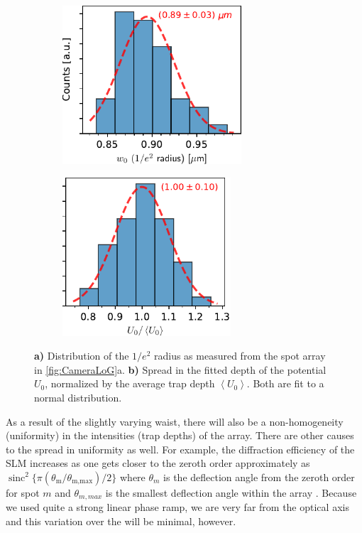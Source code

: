 \begin{figure}
	\begin{subfigure}{.49\linewidth}
		\centering
		\includegraphics[height=5.9cm]{figures/WaistHistogram.pdf}
		\caption{}
		\label{fig:WaistHistogram}
	\end{subfigure}
	\hfill
	\begin{subfigure}{.49\linewidth}
		\centering
		\includegraphics[height=5.9cm]{figures/DepthHistogram.pdf}
		\caption{}
		\label{fig:DepthHistogram}
	\end{subfigure}
	\caption{
	\textsf{\textbf{a)}} Distribution of the $1/e^2$ radius as measured from the spot array in \cref{fig:CameraLoG}a.
   \textsf{\textbf{b)}} Spread in the fitted depth of the potential $U_0$, normalized by the     average trap depth $\left\langle U_0 \right\rangle$.
    Both are fit to a normal distribution.
    }
\end{figure}


As a result of the slightly varying waist, there will also be a non-homogeneity (uniformity) in the intensities (trap depths) of the array.
There are other causes to the spread in uniformity as well.
For example, the diffraction efficiency of the SLM increases as one gets closer to the zeroth order approximately as $\operatorname{sinc}^2\{
\pi (\theta_{\text{m}}/\theta_{\text{m,max}})/2\}$ where $\theta_m$ is the deflection angle from the zeroth order for spot $m$ and $\theta_{m,max}$ is the smallest deflection angle within the array \cite{Ebadi2021}.
Because we used quite a strong linear phase ramp, we are very far from the optical axis and this variation over the will be minimal, however.


